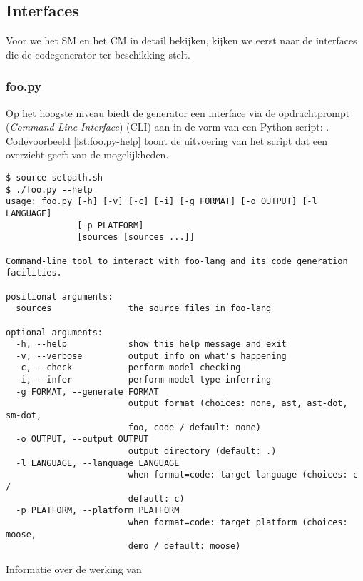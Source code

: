 
\subsection{Interfaces}
\label{subsection:devel-codegen-interfaces}

Voor we het SM en het CM in detail bekijken, kijken we eerst naar de interfaces
die de codegenerator ter beschikking stelt.

\subsubsection{foo.py}

Op het hoogste niveau biedt de generator een interface via de opdrachtprompt
(\emph{Command-Line Interface}) (CLI) aan in de vorm van een Python script:
. Codevoorbeeld \ref{lst:foo.py-help} toont de uitvoering van het
script dat een overzicht geeft van de mogelijkheden.

\begin{listing}[ht]
  \begin{verbatim}
$ source setpath.sh
$ ./foo.py --help
usage: foo.py [-h] [-v] [-c] [-i] [-g FORMAT] [-o OUTPUT] [-l LANGUAGE]
              [-p PLATFORM]
              [sources [sources ...]]

Command-line tool to interact with foo-lang and its code generation
facilities.

positional arguments:
  sources               the source files in foo-lang

optional arguments:
  -h, --help            show this help message and exit
  -v, --verbose         output info on what's happening
  -c, --check           perform model checking
  -i, --infer           perform model type inferring
  -g FORMAT, --generate FORMAT
                        output format (choices: none, ast, ast-dot, sm-dot,
                        foo, code / default: none)
  -o OUTPUT, --output OUTPUT
                        output directory (default: .)
  -l LANGUAGE, --language LANGUAGE
                        when format=code: target language (choices: c /
                        default: c)
  -p PLATFORM, --platform PLATFORM
                        when format=code: target platform (choices: moose,
                        demo / default: moose)
  \end{verbatim}
  \vspace{-5mm}
  \caption{Informatie over de werking van }
  \label{lst:foo.py-help}
\end{listing}

